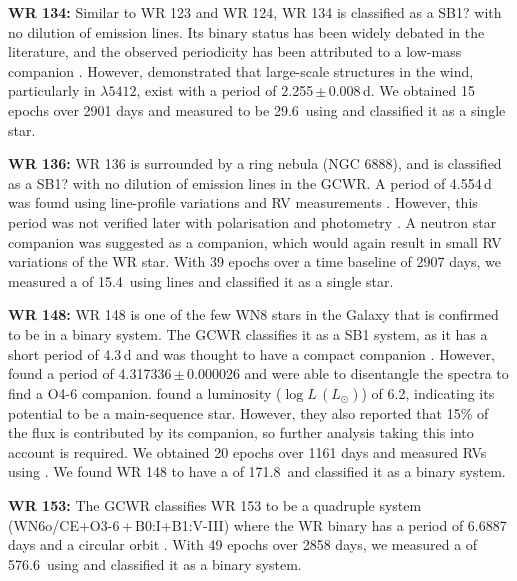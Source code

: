 \textbf{WR 134:} Similar to WR 123 and WR 124, WR 134 is classified as a SB1? with no dilution of emission lines. Its binary status has been widely debated in the literature, and the observed periodicity has been attributed to a low-mass companion \citep{marchenko_time-frequency_1998,rustamov_spectral_2012}. However, \citet{aldoretta_extensive_2016} demonstrated that large-scale structures in the wind, particularly in \heii{} $\lambda 5412$, exist with a period of 2.255\,$\pm$\,0.008\,d. We obtained 15 epochs over 2901 days and measured \DelRV{} to be 29.6\,\kms{} using \NVred{} and classified it as a single star.

\textbf{WR 136:}  WR 136 is surrounded by a ring nebula (NGC 6888), and is classified as a SB1? with no dilution of emission lines in the GCWR. A period of 4.554\,d was found using line-profile variations \citep{koenigsberger_spectral_1980} and RV measurements \citep{aslanov_hd_1981}. However, this period was not verified later with polarisation \citep{robert_polarization_1989} and photometry \citep{moffat_photometric_1986}. A neutron star companion was suggested as a companion, which would again result in small RV variations of the WR star. With 39 epochs over a time baseline of 2907 days, we measured a \DelRV{} of 15.4\,\kms{} using \heii{} lines and classified it as a single star. 

\textbf{WR 148:} WR 148 is one of the few WN8 stars in the Galaxy that is confirmed to be in a binary system. The GCWR classifies it as a SB1 system, as it has a short period of 4.3\,d and was thought to have a compact companion \citep{drissen_spectroscopic_1986,bracher_wolf-rayet_1979,marchenko_wolf-rayet_1996}. However, \citet{munoz_wr_2017} found a period of 4.317336\,$\pm$\,0.000026 and were able to disentangle the spectra to find a O4-6 companion. \citet{hamann_galactic_2019} found a luminosity ($\log L$\,$(L_\odot)$) of 6.2, indicating its potential to be a main-sequence star. However, they also reported that 15\% of the flux is contributed by its companion, so further analysis taking this into account is required. We obtained 20 epochs over 1161 days and measured RVs using \NIVred{}. We found WR 148 to have a \DelRV{} of 171.8\,\kms{} and classified it as a binary system. 

\textbf{WR 153:} The GCWR classifies WR 153 to be a quadruple system (WN6o/CE+O3-6\,+\,B0:I+B1:V-III) where the WR binary has a period of 6.6887 days and a circular orbit \citep{massey_spectroscopic_1981,demers_quadruple_2002}. With 49 epochs over 2858 days, we measured a \DelRV{} of 576.6\,\kms{} using \NVblue{} and classified it as a binary system. 

